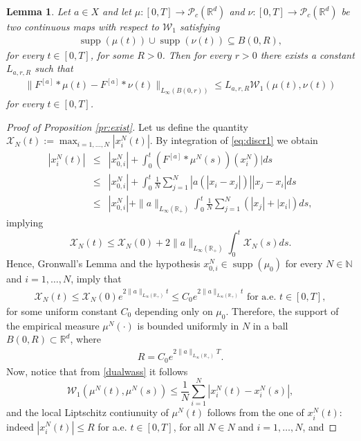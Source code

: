 \documentclass[A4paper,11pt]{article}
\newtheorem{lemma}[theorem]{Lemma}
\theoremstyle{definition}
\newcommand{\N}{\mathbb{N}}
\newcommand{\R}{\mathbb{R}}
\newcommand{\W}{\mathcal{W}}
\DeclareMathOperator{\supp}{supp}
\newcommand{\Fun}[1]{F^{[#1]}}
\begin{document}
\begin{lemma}\label{p-lipkernel}
Let $a \in X$ and let $\mu:[0,T] \rightarrow \mathcal{P}_c(\R^d)$ and $\nu: [0,T] \to \mathcal{P}_c(\R^d)$ be two continuous maps with respect to $\W_1$ satisfying
\begin{align}\label{eq:bsupp}
\supp(\mu(t)) \cup \supp(\nu(t)) \subseteq B(0,R),
\end{align}
for every $t \in [0,T]$, for some $R > 0$. Then for every $r > 0$ there exists a constant $L_{a,r,R}$ such that
\begin{align}\label{eq:inftynormW1}
\|\Fun{a} * \mu(t) - \Fun{a} * \nu(t)\|_{L_{\infty}(B(0,r))} \leq L_{a,r,R} \W_1(\mu(t),\nu(t))
\end{align}
for every $t \in [0,T]$.
\end{lemma}


\begin{proof}[Proof of Proposition \ref{pr:exist}]
Let us define the quantity $\mathcal X_N(t) := \max_{i=1,\dots,N} |x_i^N(t)|$. By integration of \eqref{eq:discr1} we obtain
\begin{eqnarray*}
 |x_i^N(t)| &\leq& |x^N_{0,i}| + \int_0^t (\Fun{a} * \mu^N(s))(x_i^N)| ds \\
&\leq&  |x^N_{0,i}| + \int_0^t\frac{1}{N} \sum_{j=1}^N |a(|x_i-x_j|)||x_j-x_i| ds \\
&\leq&  |x^N_{0,i}| + \|a\|_{L_{\infty}(\R_+)} \int_0^t\frac{1}{N} \sum_{j=1}^N( |x_j| + | x_i| )ds,
\end{eqnarray*}
implying
$$
\mathcal X_N(t) \leq \mathcal X_N(0) + 2  \|a\|_{L_{\infty}(\R_+)} \int_0^t \mathcal X_N(s) ds. 
$$
Hence, Gronwall's Lemma and the hypothesis $x^{N}_{0,i} \in \supp(\mu_0)$ for every $N \in \N$ and $i = 1, \ldots, N$, imply that
\begin{align*}
\mathcal X_N(t) \leq \mathcal X_N(0) e^{2 \|a\|_{L_{\infty}(\R_+)} t} \leq C_0 e^{2 \|a\|_{L_{\infty}(\R_+)} t} \text{ for a.e. } t \in [0,T],
\end{align*}
for some uniform constant $C_0$ depending only on $\mu_0$. Therefore, the support of the empirical measure $\mu^N(\cdot)$ is bounded uniformly in $N$ in a ball $B(0,R) \subset \R^d$, where
\begin{align}\label{Rest}
R =  C_0 e^{2 \|a\|_{L_{\infty}(\R_+)} T}.
\end{align}
Now, notice that from \eqref{dualwass} it follows
$$
\mathcal W_1(\mu^N(t), \mu^N(s)) \leq \frac{1}{N} \sum_{i=1}^N | x_i^N(t) - x_i^N(s)| ,
$$
and the local Liptschitz contiunuity of $\mu^N(t)$ follows from the one of $x_i^N(t)$: indeed  $|x^N_i(t)| \leq R$ for a.e. $t \in [0,T]$, for all $N \in N$ and $i = 1, \ldots, N$, and %

\end{proof}
\end{document}
